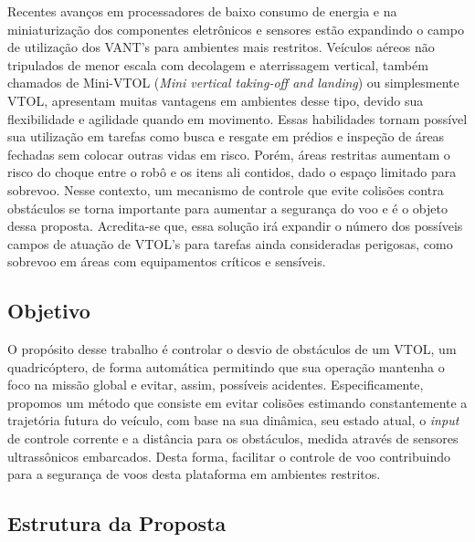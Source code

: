\documentclass[a4paper, 12pt]{article}
\begin{document}
Recentes avanços em processadores de baixo consumo de energia e na miniaturização dos componentes eletrônicos e sensores estão expandindo o campo de utilização dos VANT's para ambientes mais restritos. Veículos aéreos não tripulados de menor escala com decolagem e aterrissagem vertical, também chamados de Mini-VTOL (\textit{Mini vertical taking-off and landing}) ou simplesmente VTOL, apresentam muitas vantagens em ambientes desse tipo, devido sua flexibilidade e agilidade quando em movimento. Essas habilidades tornam possível sua utilização em tarefas como busca e resgate em prédios e inspeção de áreas fechadas sem colocar outras vidas em risco. Porém, áreas restritas aumentam o risco do choque entre o robô e os itens ali contidos, dado o espaço limitado para sobrevoo. Nesse contexto, um mecanismo de controle que evite colisões contra obstáculos se torna importante para aumentar a segurança do voo e é o objeto dessa proposta. Acredita-se que, essa solução irá expandir o número dos possíveis campos de atuação de VTOL's para tarefas ainda consideradas perigosas, como sobrevoo em áreas com equipamentos críticos e sensíveis.



\subsection{Objetivo}

O propósito desse trabalho é controlar o desvio de obstáculos de um VTOL, um quadricóptero, de forma automática permitindo que sua operação mantenha o foco na missão global e evitar, assim, possíveis acidentes. Especificamente, propomos um método que consiste em evitar colisões estimando constantemente a trajetória futura do veículo, com base na sua dinâmica, seu estado atual, o \textit{input} de controle corrente e a distância para os obstáculos, medida através de sensores ultrassônicos embarcados. Desta forma,  facilitar o controle de voo contribuindo para a segurança de voos desta plataforma em ambientes restritos. 



\subsection{Estrutura da Proposta}
\end{document}

